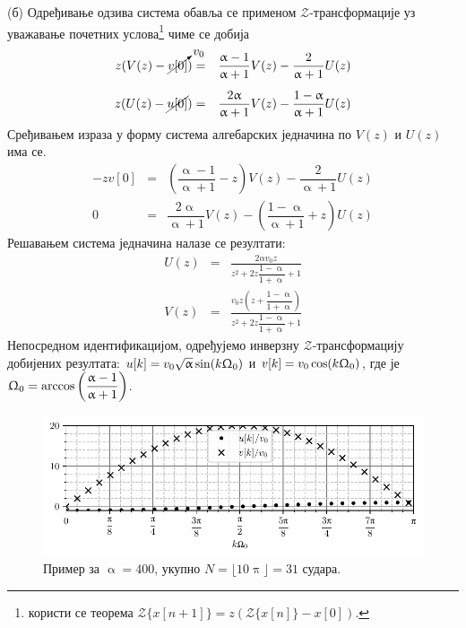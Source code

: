 
(б) Одређивање одзива система обавља се применом $\mathcal{Z}$-трансформације уз уважавање почетних 
услова\footnote{користи се теорема $\mathcal Z\{x[n + 1]\} = z(\mathcal Z \{x[n]\} - x[0])$. }
чиме се добија
\begin{eqnarray}
    z(V(z) - 
    \cancelto{v_0}{v[0]}
    ) & = & \dfrac{\upalpha - 1}{\upalpha + 1} V(z) - \dfrac{2}{\upalpha + 1} U(z) \\[2mm]
    z(U(z) - \cancel{u[0]} ) & = & \dfrac{2\upalpha}{\upalpha + 1} V(z) - \dfrac{1 - \upalpha}{\upalpha + 1} U(z)
\end{eqnarray}
Сређивањем израза у форму система алгебарских једначина по $V(z)$ и $U(z)$ има се.
\begin{eqnarray}
    - z v[0] & = & \left( \dfrac{\upalpha - 1}{\upalpha + 1} - z \right) V(z) - \dfrac{2}{\upalpha + 1} U(z) \\[2mm]
    0 & = & \dfrac{2\upalpha}{\upalpha + 1} V(z) - \left( \dfrac{1 - \upalpha}{\upalpha + 1} + z \right) 
    U(z)
\end{eqnarray}
Решавањем система једначина налазе се резултати: 
\begin{eqnarray}
    U(z) & = & 
    \frac{2 \alpha v_{0} z}
    {z^{2} + 2 z \dfrac{1 - \upalpha}{1 + \upalpha} + 1}
    \\[2mm]
    V(z) & = & 
    \frac{v_{0} z \left(z + \dfrac{1 - \upalpha}{1 + \upalpha} \right) }
    {z^{2} + 2 z \dfrac{1 - \upalpha}{1 + \upalpha} + 1}
\end{eqnarray}
Непосредном идентификацијом, одређујемо инверзну $\mathcal{Z}$-трансформацију добијених резултата: 
$u[k] = v_0\sqrt\upalpha \sin(k\Upomega_0)$ и 
$v[k] = v_0\cos(k\Upomega_0)$, где је $\Upomega_0 = \arccos\left( \dfrac{\upalpha-1}{\upalpha+1} \right)$.

\begin{figure}[b!]
    \centering
    \includegraphics[scale=1]{fig/blokovi_plot.pdf}
    \caption{Пример за $\upalpha = 400$, укупно $N = \lfloor 10\uppi \rfloor = 31$ судара.}
    \label{fig:\ID.primer}
\end{figure}

